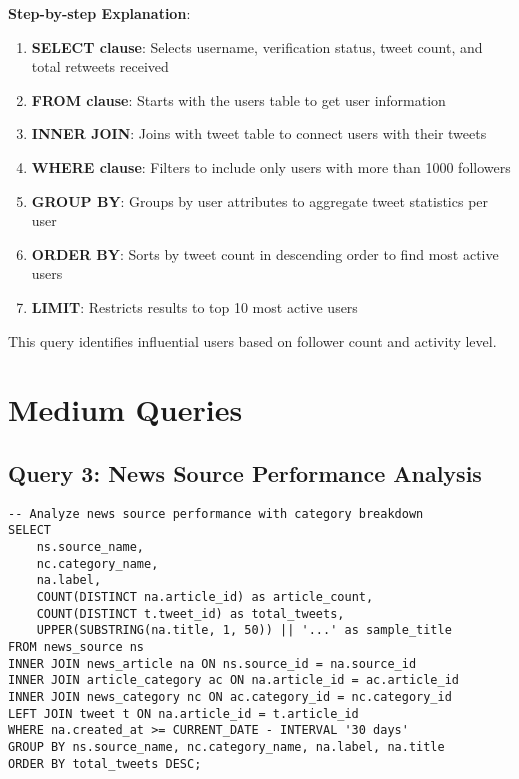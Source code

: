 \documentclass[12pt,a4paper]{report}
\begin{document}
\textbf{Step-by-step Explanation}:
\begin{enumerate}
    \item \textbf{SELECT clause}: Selects username, verification status, tweet count, and total retweets received
    \item \textbf{FROM clause}: Starts with the users table to get user information
    \item \textbf{INNER JOIN}: Joins with tweet table to connect users with their tweets
    \item \textbf{WHERE clause}: Filters to include only users with more than 1000 followers
    \item \textbf{GROUP BY}: Groups by user attributes to aggregate tweet statistics per user
    \item \textbf{ORDER BY}: Sorts by tweet count in descending order to find most active users
    \item \textbf{LIMIT}: Restricts results to top 10 most active users
\end{enumerate}
This query identifies influential users based on follower count and activity level.

\section{Medium Queries}

\subsection{Query 3: News Source Performance Analysis}
\begin{lstlisting}[caption={Medium Query 1}]
-- Analyze news source performance with category breakdown
SELECT 
    ns.source_name,
    nc.category_name,
    na.label,
    COUNT(DISTINCT na.article_id) as article_count,
    COUNT(DISTINCT t.tweet_id) as total_tweets,
    UPPER(SUBSTRING(na.title, 1, 50)) || '...' as sample_title
FROM news_source ns
INNER JOIN news_article na ON ns.source_id = na.source_id
INNER JOIN article_category ac ON na.article_id = ac.article_id
INNER JOIN news_category nc ON ac.category_id = nc.category_id
LEFT JOIN tweet t ON na.article_id = t.article_id
WHERE na.created_at >= CURRENT_DATE - INTERVAL '30 days'
GROUP BY ns.source_name, nc.category_name, na.label, na.title
ORDER BY total_tweets DESC;
\end{lstlisting}
\end{document}

